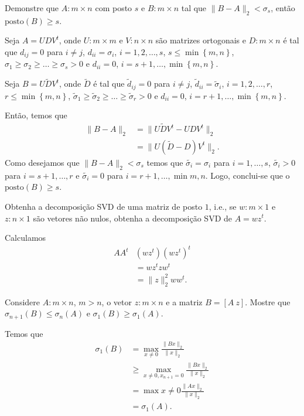 \documentclass[a4paper,12pt, leqno, answers]{exam}
\begin{document}
\begin{questions}
    \question Demonstre que $A : m \times n$ com posto $s$ e $B : m \times n$ tal que $\| B - A \|_2 < \sigma_s$, ent\~{a}o $\mathrm{posto}(B) \geq s$.
    \begin{solution}
        Seja $A = U D V^t$, onde $U : m \times m$ e $V : n \times n$ s\~{a}o matrizes ortogonais e $D : m \times n$ \'{e} tal que $d_{ij} = 0$ para $i \neq j$, $d_{ii} = \sigma_i$, $i = 1, 2, \ldots, s$, $s \leq \min\left\{ m, n \right\}$, $\sigma_1 \geq \sigma_2 \geq \ldots \geq \sigma_s > 0$ e $d_{ii} = 0$, $i = s + 1, \ldots, \min\left\{ m, n \right\}$. 

        Seja $B = U \tilde{D} V^t$, onde $\tilde{D}$ \'{e} tal que $\tilde{d}_{ij} = 0$ para $i \neq j$, $\tilde{d}_{ii} = \tilde{\sigma}_i$, $i = 1, 2, \ldots, r$, $r \leq \min\left\{ m, n \right\}$, $\tilde{\sigma}_1 \geq \tilde{\sigma}_2 \geq \ldots \geq \tilde{\sigma}_r > 0$ e $d_{ii} = 0$, $i = r + 1, \ldots, \min\left\{ m, n \right\}$. 

        Ent\~{a}o, temos que
        \begin{align*}
            \| B - A \|_2 &= \| U \tilde{D} V^t - U D V^t \|_2 \\
            &= \| U \left( \tilde{D} - D \right) V^t \|_2.
        \end{align*}
        Como desejamos que $\| B - A \|_2 < \sigma_s$ temos que $\tilde{\sigma_i} = \sigma_i$ para $i = 1, \ldots, s$, $\tilde{\sigma_i} > 0$ para $i = s + 1, \ldots, r$ e $\tilde{\sigma_i} = 0$ para $i = r + 1, \ldots, \min{m, n}$. Logo, conclui-se que o $\mathrm{posto}(B) \geq s$.
    \end{solution}

    \question Obtenha a decomposi\c{c}\~{a}o SVD de uma matriz de posto $1$, i.e., se $w : m \times 1$ e $z : n \times 1$ s\~{a}o vetores n\~{a}o nulos, obtenha a decomposi\c{c}\~{a}o SVD de $A = w z^t$.
    \begin{solution}
        Calculamos
        \begin{align*}
            A A^t & \left( w z^t \right) \left( w z^t \right)^t \\
            &= w z^t z w^t \\
            &= \| z \|_2^2 w w^t.
        \end{align*}
    \end{solution}

    \question Considere $A : m \times n$, $m > n$, o vetor $z : m \times n$ e a matriz $B = [A \ z]$. Mostre que $\sigma_{n + 1}(B) \leq \sigma_n(A)$ e $\sigma_1(B) \geq \sigma_1(A)$.
    \begin{solution}
        Temos que
        \begin{align*}
            \sigma_1(B) &= \max_{x \neq 0} \frac{\| B x \|_2}{\| x \|_2} \\
            &\geq \max_{x \neq 0, x_{n + 1} = 0} \frac{\| B x \|_2}{\| x \|_2} \\
            &= \max{x \neq 0} \frac{\| A x \|_2}{\| x \|_2} \\
            &= \sigma_1(A).
        \end{align*}
    \end{solution}


\end{questions}
\end{document}
